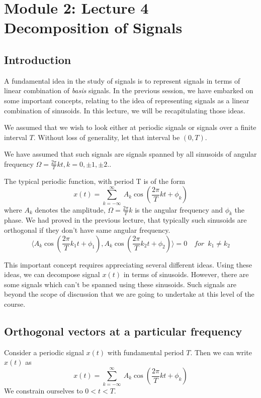 \section{Module 2: Lecture 4\\Decomposition of Signals}

\subsection{Introduction}
\noindent
 A fundamental idea in the study of signals is to represent signals in terms of linear combination of \textit{basis} signals. In the previous session, we have embarked on some important concepts, relating to the idea of representing signals as a linear combination of sinusoids. In this lecture, we will be recapitulating those ideas.
 
\noindent
We assumed that we wish to look either at periodic signals or signals over a finite interval $T$. Without loss of generality, let that interval be $(0,T)$. 

\noindent
We have assumed that such signals are signals spanned by  all sinusoids of angular frequency $\Omega = \frac{2\pi}{T}kt,k=0, \pm1, \pm2 ..$

\noindent
The typical periodic function, with period T is of the form   \
                              \begin{equation*}x(t) = \sum_{k=-\infty}^{\infty}\ A_k\cos (\frac{2\pi}{T}kt + \phi_k)\end{equation*}
        where $A_k$ denotes the amplitude, $\Omega = \frac{2\pi}{T}k$ is the angular frequency and $\phi_k$ the phase.
  We had proved in the previous lecture, that typically such sinusoids are orthogonal if they don’t have same angular frequency.
  \begin{equation*}
\langle A_k \cos (\frac{2\pi}{T}k_1t + \phi_1),A_k \cos (\frac{2\pi}{T}k_2t + \phi_2)\rangle = 0 \enspace \enspace		for \enspace k_1 \neq k_2 \end{equation*}

\noindent
This important concept requires appreciating several different ideas. Using these ideas, we can decompose signal $x(t)$ in terms of sinusoids. However, there are some signals which can’t be spanned using these sinusoids. Such signals are beyond the scope of discussion that we are going to undertake at this level of the course.

\subsection{ Orthogonal vectors at a particular frequency}
\noindent
Consider a periodic signal $x(t)$ with fundamental period $T$. Then we can write $x(t)$ as
\begin{equation*}x(t) = \sum_{k=-\infty}^{\infty}\ A_k\cos (\frac{2\pi}{T}kt + \phi_k)\end{equation*}
We constrain ourselves to $0<t<T$.

